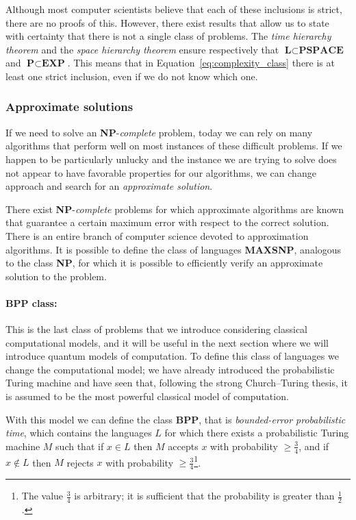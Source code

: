 Although most computer scientists believe that each of these inclusions is strict, there are no proofs of this. However, there exist results that allow us to state with certainty that there is not a single class of problems. The \emph{time hierarchy theorem} and the \emph{space hierarchy theorem} ensure respectively that $\textbf{L} \subset \textbf{PSPACE}$ and $\textbf{P} \subset \textbf{EXP}$. This means that in Equation~\ref{eq:complexity_class} there is at least one strict inclusion, even if we do not know which one.

\subsubsection*{Approximate solutions}
If we need to solve an \textbf{NP}-\emph{complete} problem, today we can rely on many algorithms that perform well on most instances of these difficult problems. If we happen to be particularly unlucky and the instance we are trying to solve does not appear to have favorable properties for our algorithms, we can change approach and search for an \emph{approximate solution}.

There exist \textbf{NP}-\emph{complete} problems for which approximate algorithms are known that guarantee a certain maximum error with respect to the correct solution. There is an entire branch of computer science devoted to approximation algorithms. It is possible to define the class of languages \textbf{MAXSNP}, analogous to the class \textbf{NP}, for which it is possible to efficiently verify an approximate solution to the problem.

\paragraph{BPP class:} This is the last class of problems that we introduce considering classical computational models, and it will be useful in the next section where we will introduce quantum models of computation. To define this class of languages we change the computational model; we have already introduced the probabilistic Turing machine and have seen that, following the strong Church–Turing thesis, it is  assumed to be the most powerful classical model of computation.

With this model we can define the class \textbf{BPP}, that is \emph{bounded-error probabilistic time}, which contains the languages $L$ for which there exists a probabilistic Turing machine $M$ such that if $x\in L$ then $M$ accepts $x$ with probability $\geq \frac{3}{4}$, and if $x\notin L$ then $M$ rejects $x$ with probability $\geq \frac{3}{4}$\footnote{The value $\frac{3}{4}$ is arbitrary; it is sufficient that the probability is greater than $\frac{1}{2}$.}.

